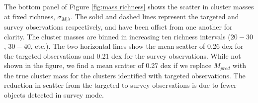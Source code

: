 \documentclass[fleqn,usenatbib]{mnras}
\newcommand{\editorial}[1]{\textcolor{red}{#1}}
\begin{document}
The bottom panel of Figure \ref{fig:mass richness} shows the scatter in cluster masses at fixed richness, $\sigma_{M|\lambda}$. The solid and dashed lines represent the targeted and survey observations respectively, and have been offset from one another for clarity. The cluster masses are binned in increasing ten richness intervals ($20-30$, $30-40$, etc.). The two horizontal lines show the mean scatter of 0.26 dex for the targeted observations and 0.21 dex for the survey observations. While not shown in the figure, we find a mean scatter of 0.27 dex if we replace $M_{pred}$ with the true cluster mass for the clusters identified with targeted observations. The reduction in scatter from the targeted to survey observations is due to fewer objects detected in survey mode.

	

\end{document}
